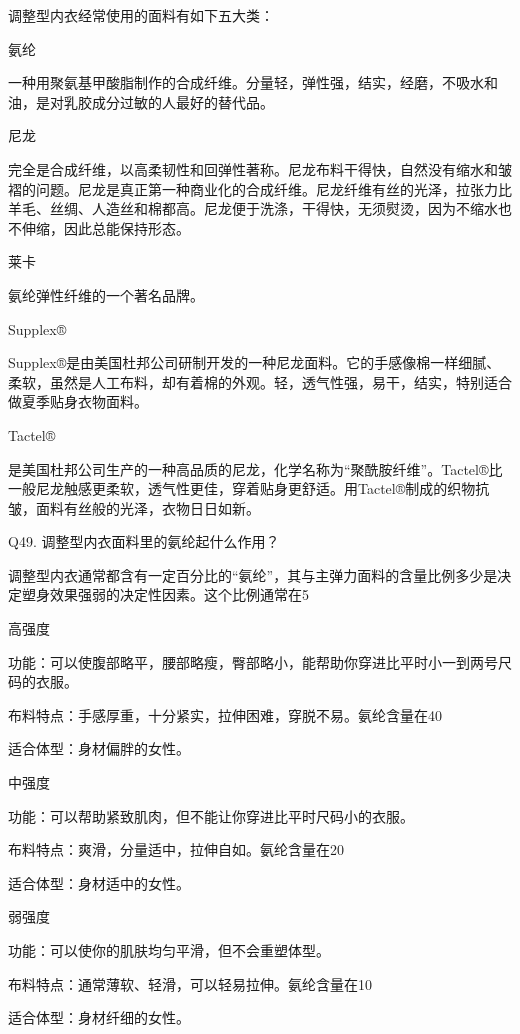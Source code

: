 \documentclass[12pt,UTF8]{ctexbook}
\begin{document}
调整型内衣经常使用的面料有如下五大类：

氨纶

一种用聚氨基甲酸脂制作的合成纤维。分量轻，弹性强，结实，经磨，不吸水和油，是对乳胶成分过敏的人最好的替代品。

尼龙

完全是合成纤维，以高柔韧性和回弹性著称。尼龙布料干得快，自然没有缩水和皱褶的问题。尼龙是真正第一种商业化的合成纤维。尼龙纤维有丝的光泽，拉张力比羊毛、丝绸、人造丝和棉都高。尼龙便于洗涤，干得快，无须熨烫，因为不缩水也不伸缩，因此总能保持形态。

莱卡

氨纶弹性纤维的一个著名品牌。

Supplex®

Supplex®是由美国杜邦公司研制开发的一种尼龙面料。它的手感像棉一样细腻、柔软，虽然是人工布料，却有着棉的外观。轻，透气性强，易干，结实，特别适合做夏季贴身衣物面料。

Tactel®

是美国杜邦公司生产的一种高品质的尼龙，化学名称为“聚酰胺纤维”。Tactel®比一般尼龙触感更柔软，透气性更佳，穿着贴身更舒适。用Tactel®制成的织物抗皱，面料有丝般的光泽，衣物日日如新。





Q49. 调整型内衣面料里的氨纶起什么作用？


调整型内衣通常都含有一定百分比的“氨纶”，其与主弹力面料的含量比例多少是决定塑身效果强弱的决定性因素。这个比例通常在5%

高强度

功能：可以使腹部略平，腰部略瘦，臀部略小，能帮助你穿进比平时小一到两号尺码的衣服。

布料特点：手感厚重，十分紧实，拉伸困难，穿脱不易。氨纶含量在40%

适合体型：身材偏胖的女性。

中强度

功能：可以帮助紧致肌肉，但不能让你穿进比平时尺码小的衣服。

布料特点：爽滑，分量适中，拉伸自如。氨纶含量在20%

适合体型：身材适中的女性。

弱强度

功能：可以使你的肌肤均匀平滑，但不会重塑体型。

布料特点：通常薄软、轻滑，可以轻易拉伸。氨纶含量在10%

适合体型：身材纤细的女性。
\end{document}
